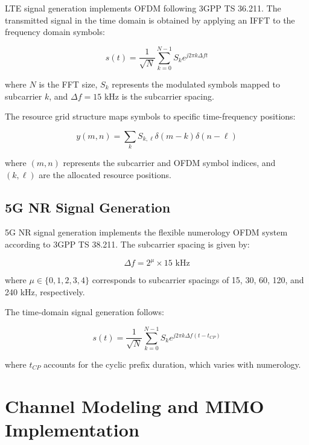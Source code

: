 \documentclass[conference]{IEEEtran}
\begin{document}
LTE signal generation implements OFDM following 3GPP TS 36.211. The transmitted signal in the time domain is obtained by applying an IFFT to the frequency domain symbols:

\begin{equation}
s(t) = \frac{1}{\sqrt{N}} \sum_{k=0}^{N-1} S_k e^{j2\pi k \Delta f t}
\label{eq:lte_ofdm}
\end{equation}

where $N$ is the FFT size, $S_k$ represents the modulated symbols mapped to subcarrier $k$, and $\Delta f = 15$ kHz is the subcarrier spacing.

The resource grid structure maps symbols to specific time-frequency positions:

\begin{equation}
y(m,n) = \sum_{k} S_{k,\ell} \delta(m - k) \delta(n - \ell)
\label{eq:lte_resource_grid}
\end{equation}

where $(m,n)$ represents the subcarrier and OFDM symbol indices, and $(k,\ell)$ are the allocated resource positions.

\subsection{5G NR Signal Generation}

5G NR signal generation implements the flexible numerology OFDM system according to 3GPP TS 38.211. The subcarrier spacing is given by:

\begin{equation}
\Delta f = 2^\mu \times 15 \text{ kHz}
\label{eq:5g_scs}
\end{equation}

where $\mu \in \{0, 1, 2, 3, 4\}$ corresponds to subcarrier spacings of 15, 30, 60, 120, and 240 kHz, respectively.

The time-domain signal generation follows:

\begin{equation}
s(t) = \frac{1}{\sqrt{N}} \sum_{k=0}^{N-1} S_k e^{j2\pi k \Delta f (t - t_{CP})}
\label{eq:5g_ofdm}
\end{equation}

where $t_{CP}$ accounts for the cyclic prefix duration, which varies with numerology.

\section{Channel Modeling and MIMO Implementation}
\label{sec:channel_modeling}
\end{document}
